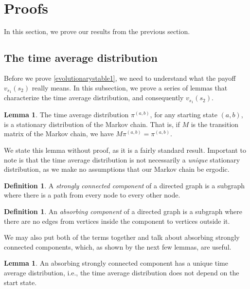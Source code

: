 \documentclass[11pt]{amsart}
\theoremstyle{definition}
\newtheorem{definition}[theorem]{Definition}
\newtheorem{lemma}[theorem]{Lemma}
\theoremstyle{remark}
\begin{document}
\section{Proofs}
\label{sectionproofs}

In this section, we prove our results from the previous section.

\subsection{The time average distribution}

Before we prove \cref{evolutionarystable1}, we need to understand what the payoff $v_{s_1}(s_2)$ really means. In this subsection, we prove a series of lemmas that characterize the time average distribution, and consequently $v_{s_1}(s_2)$.

\begin{lemma}
  \label{timeaverageisstationary}
  The time average distribution $\pi^{(a,b)}$, for any starting state $(a,b)$, is a stationary distribution of the Markov chain. That is, if $M$ is the transition matrix of the Markov chain, we have $M \pi^{(a,b)} = \pi^{(a,b)}$.
\end{lemma}

We state this lemma without proof, as it is a fairly standard result. Important to note is that the time average distribution is not necessarily a \textit{unique} stationary distribution, as we make no assumptions that our Markov chain be ergodic.

\begin{definition}
  A \textit{strongly connected component} of a directed graph is a subgraph where there is a path from every node to every other node.
\end{definition}

\begin{definition}
  An \textit{absorbing component} of a directed graph is a subgraph where there are no edges from vertices inside the component to vertices outside it.
\end{definition}

We may also put both of the terms together and talk about absorbing strongly connected components, which, as shown by the next few lemmas, are useful.

\begin{lemma}
  \label{lemmaabsorbinghasuniquetimeaverage}
  An absorbing strongly connected component has a unique time average distribution, i.e., the time average distribution does not depend on the start state.
\end{lemma}
\end{document}
